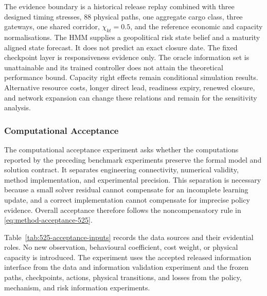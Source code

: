 \documentclass[a4paper,fleqn]{cas-sc}
\begin{document}
The evidence boundary is a historical release replay combined with three
designed timing stresses, 88 physical paths, one aggregate cargo class, three
gateways, one shared corridor, $\chi_{kt}=0.5$, and the reference economic and
capacity normalisations. The HMM supplies a geopolitical risk state belief and
a maturity aligned state forecast. It does not predict an exact closure date.
The fixed checkpoint layer is responsiveness evidence only. The oracle
information set is unattainable and its trained controller does not attain the
theoretical performance bound. Capacity right effects remain conditional
simulation results. Alternative resource costs, longer direct lead, readiness
expiry, renewed closure, and network expansion can change these relations and
remain for the sensitivity analysis.

\FloatBarrier

\subsubsection{Computational Acceptance}
\label{subsubsec:computational-methodological-acceptance}

The computational acceptance experiment asks whether the computations reported by the preceding
benchmark experiments preserve the formal model and solution contract. It separates
engineering connectivity, numerical validity, method implementation, and
experimental precision. This separation is necessary because a small solver
residual cannot compensate for an incomplete learning update, and a correct
implementation cannot compensate for imprecise policy evidence. Overall
acceptance therefore follows the noncompensatory rule in
\cref{eq:method-acceptance-525}.

Table~\ref{tab:525-acceptance-inputs} records the data sources and their
evidential roles. No new observation, behavioural coefficient, cost weight, or
physical capacity is introduced. The experiment uses the accepted released
information interface from the data and information validation experiment and
the frozen paths, checkpoints, actions, physical transitions, and losses from
the policy, mechanism, and risk information experiments.
\end{document}
